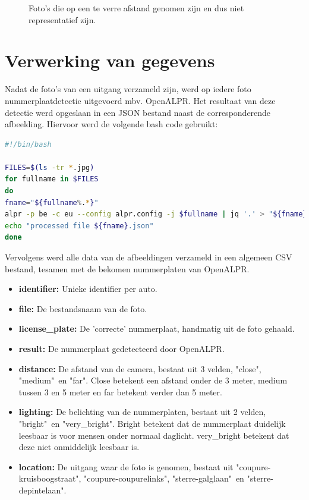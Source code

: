 \begin{figure}[h!]
\begin{subfigure}[b]{0.45\linewidth}
	\end{subfigure}
	\caption{Foto's die op een te verre afstand genomen zijn en dus niet representatief zijn.}
	\label{fig:onlyfar}
\end{figure}

\section{Verwerking van gegevens}

Nadat de foto's van een uitgang verzameld zijn, werd op iedere foto nummerplaatdetectie uitgevoerd mbv. OpenALPR. Het resultaat van deze detectie werd opgeslaan in een JSON bestand naast de corresponderende afbeelding. Hiervoor werd de volgende bash code gebruikt:

\begin{lstlisting}[language=Bash, breaklines=true]
#!/bin/bash

FILES=$(ls -tr *.jpg)
for fullname in $FILES
do
fname="${fullname%.*}"
alpr -p be -c eu --config alpr.config -j $fullname | jq '.' > "${fname}.json"
echo "processed file ${fname}.json" 
done
\end{lstlisting}

Vervolgens werd alle data van de afbeeldingen verzameld in een algemeen CSV bestand, tesamen met de bekomen nummerplaten van OpenALPR.
\begin{itemize}
	\item \textbf{identifier:} Unieke identifier per auto.
	\item \textbf{file:} De bestandsnaam van de foto.
	\item \textbf{license\_plate:} De 'correcte' nummerplaat, handmatig uit de foto gehaald.
	\item \textbf{result:} De nummerplaat gedetecteerd door OpenALPR.
	\item \textbf{distance:} De afstand van de camera, bestaat uit 3 velden, "close", "medium"\ en "far". Close betekent een afstand onder de 3 meter, medium tussen 3 en 5 meter en far betekent verder dan 5 meter.
	\item \textbf{lighting:} De belichting van de nummerplaten, bestaat uit 2 velden, "bright"\ en "very\_bright". Bright betekent dat de nummerplaat duidelijk leesbaar is voor mensen onder normaal daglicht. very\_bright betekent dat deze niet onmiddelijk leesbaar is.
	\item \textbf{location:} De uitgang waar de foto is genomen, bestaat uit "coupure-kruisboogstraat", "coupure-coupurelinks", "sterre-galglaan"\ en "sterre-depintelaan".
\end{itemize}

